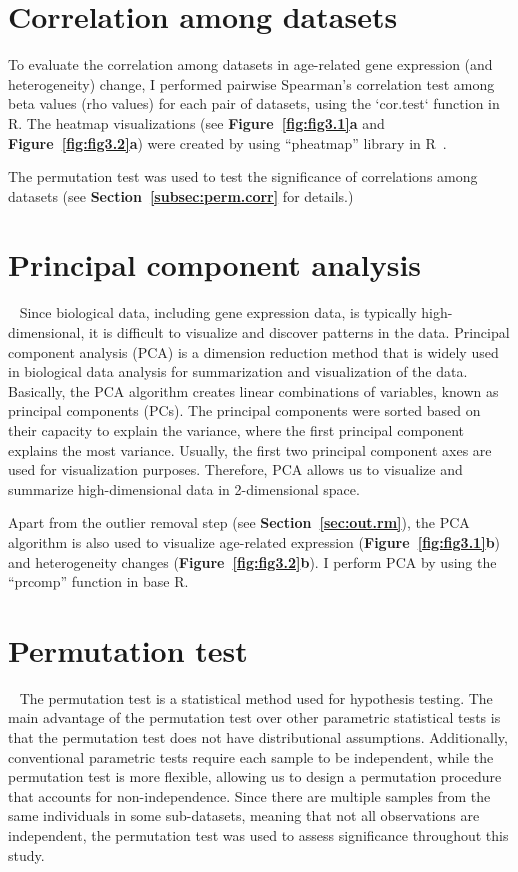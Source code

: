\section{Correlation among datasets}
To evaluate the correlation among datasets in age-related gene expression (and heterogeneity) change, 
I performed pairwise Spearman's correlation test among beta values (rho values) for each pair of datasets, using the `cor.test` function in R.
The heatmap visualizations (see \textbf{Figure~\ref{fig:fig3.1}a} and \textbf{Figure~\ref{fig:fig3.2}a}) were created by using ``pheatmap'' library in R~\autocite{Kolde2019}.

The permutation test was used to test the significance of correlations among datasets (see \textbf{Section~\ref{subsec:perm.corr}} for details.)

\section{Principal component analysis}~\label{sec:pca}
Since biological data, including gene expression data, is typically high-dimensional, it is difficult to visualize and discover patterns in the data.
Principal component analysis (PCA) is a dimension reduction method that is widely used in biological data analysis for summarization and visualization of the data.
Basically, the PCA algorithm creates linear combinations of variables, known as principal components (PCs). 
The principal components were sorted based on their capacity to explain the variance, where the first principal component explains the most variance.
Usually, the first two principal component axes are used for visualization purposes. 
Therefore, PCA allows us to visualize and summarize high-dimensional data in 2-dimensional space.

Apart from the outlier removal step (see \textbf{Section~\ref{sec:out.rm}}), 
the PCA algorithm is also used to visualize age-related expression (\textbf{Figure~\ref{fig:fig3.1}b}) and heterogeneity changes (\textbf{Figure~\ref{fig:fig3.2}b}).
I perform PCA by using the ``prcomp'' function in base R.

\section{Permutation test}~\label{sec:perm}
The permutation test is a statistical method used for hypothesis testing. 
The main advantage of the permutation test over other parametric statistical tests is that the permutation test does not have distributional assumptions.
Additionally, conventional parametric tests require each sample to be independent, 
while the permutation test is more flexible, allowing us to design a permutation procedure that accounts for non-independence.
Since there are multiple samples from the same individuals in some sub-datasets, meaning that not all observations are independent, 
the permutation test was used to assess significance throughout this study.

